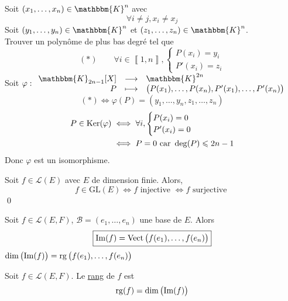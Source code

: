 \begin{exo}
	Soit $(x_1, \ldots, x_n) \in \mathbbm{K}^n$ avec \[
		\forall i \neq j, x_i \neq x_j
	\] Soit $(y_1, \ldots, y_n) \in \mathbbm{K}^n$ et $(z_1, \ldots, z_n) \in \mathbbm{K}^n$.\\
	Trouver un polynôme de plus bas degré tel que \[
		(*) \qquad \forall i \in \left\llbracket 1,n \right\rrbracket, \begin{cases}
			P(x_i) = y_i\\
			P'(x_i) = z_i
		\end{cases}
	\]
	Soit $\varphi : \begin{array}{rcl}
		\mathbbm{K}_{2n-1}[X] &\longrightarrow& \mathbbm{K}^{2n} \\
		P &\longmapsto& \big(P(x_1), \ldots, P(x_n), P'(x_1), \ldots, P'(x_n)\big) 
	\end{array}$ \[
		(*) \iff \varphi(P) = (y_1, \ldots, y_n, z_1, \ldots, z_n)
	\] 
	\begin{align*}
		P \in \operatorname{Ker}(\varphi) &\iff \forall i, \begin{cases}
			P(x_i) = 0\\
			P'(x_i) = 0
		\end{cases}\\
		&\iff P = 0 \text{ car } \deg(P) \leqslant 2n-1
	\end{align*}
	Donc $\varphi$ est un isomorphisme.
\end{exo}

\begin{crlr}
	Soit $f \in \mathcal{L}(E)$ avec $E$ de dimension finie. Alors, \[
		f \in \mathrm{GL}(E) \iff f \text{ injective } \iff f \text{ surjective }
	\]\qed
\end{crlr}

\begin{rmk}
	Soit $f \in \mathcal{L}(E,F)$, $\mathcal{B} = (e_1, \ldots, e_n)$ une base de $E$. Alors \[
		\boxed{\mathrm{Im}(f) = \operatorname{Vect}\big(f(e_1), \ldots, f(e_n)\big)}
	\]
	$\dim\big(\mathrm{Im}(f)\big) = \operatorname{rg}\big(f(e_1), \ldots, f(e_n)\big)$
\end{rmk}

\begin{defn}
	Soit $f \in \mathcal{L}(E,F)$. Le \underline{rang} de $f$ est \[
		\operatorname{rg}(f) = \dim\big(\mathrm{Im}(f)\big)
	\]
\end{defn}
